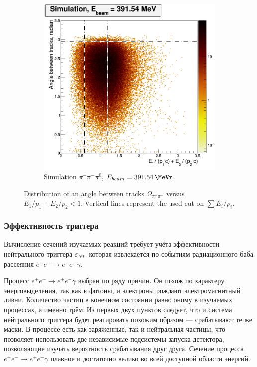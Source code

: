 \begin{figure}[htbp]
\begin{subfigure}[b]{0.45\textwidth}
        \includegraphics[width=\textwidth]{img/raskl_vs_sumEP_sim391_54.png}
        \caption{Simulation $\pi^+ \pi^- \pi^0$, $E_{beam} = \SI{391.54}{\MeVr}$.}
        \label{fig:raskl_sim391_54}
    \end{subfigure}
    \caption{Distribution of an angle between tracks $\Omega_{\pi^+ \pi^-}$ versus $E_1/p_1 + E_2 / p_2 < 1$.
    Vertical lines represent the used cut on $\sum E_i / p_i$.}\label{fig:raskl}
\end{figure}




\subsubsection{Эффективность триггера}

Вычисление сечений изучаемых реакций требует учёта эффективности нейтрального триггера $\varepsilon_{NT}$,
которая извлекается по событиям радиационного баба рассеяния $e^+e^- \to e^+e^-\gamma$.


Процесс $e^+e^- \to e^+e^-\gamma$ выбран по ряду причин.
Он похож по характеру энерговыделения,
так как и фотоны,
и электроны рождают электромагнитный ливни.
Количество частиц в конечном состоянии равно оному в изучаемых процессах,
а именно трём.
Из первых двух пунктов следует,
что и система нейтрального триггера будет реагировать похожим образом
---
срабатывают те же маски.
В процессе есть как заряженные,
так и нейтральная частицы,
что позволяет использовать две независимые подсистемы запуска детектора,
позволяющие изучать вероятность срабатывания друг друга.
Сечение процесса $e^+e^- \to e^+e^-\gamma$ плавное и достаточно велико во всей доступной области энергий.


